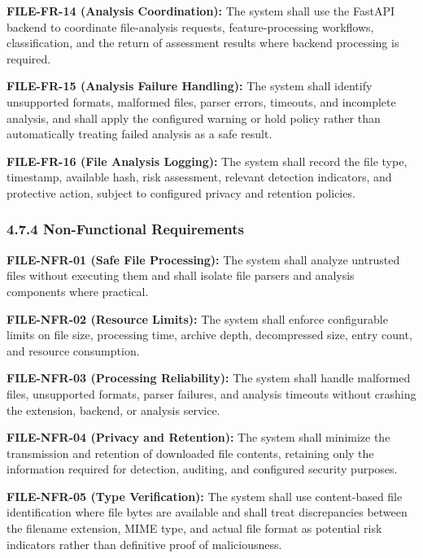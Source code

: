 \documentclass[12pt,a4paper]{report}
\begin{document}
\textbf{FILE-FR-14 (Analysis Coordination):} The system shall use the FastAPI backend to coordinate file-analysis requests, feature-processing workflows, classification, and the return of assessment results where backend processing is required.\par

\textbf{FILE-FR-15 (Analysis Failure Handling):} The system shall identify unsupported formats, malformed files, parser errors, timeouts, and incomplete analysis, and shall apply the configured warning or hold policy rather than automatically treating failed analysis as a safe result.\par

\textbf{FILE-FR-16 (File Analysis Logging):} The system shall record the file type, timestamp, available hash, risk assessment, relevant detection indicators, and protective action, subject to configured privacy and retention policies.\par

\subsubsection*{4.7.4 Non-Functional Requirements}

\textbf{FILE-NFR-01 (Safe File Processing):} The system shall analyze untrusted files without executing them and shall isolate file parsers and analysis components where practical.\par

\textbf{FILE-NFR-02 (Resource Limits):} The system shall enforce configurable limits on file size, processing time, archive depth, decompressed size, entry count, and resource consumption.\par

\textbf{FILE-NFR-03 (Processing Reliability):} The system shall handle malformed files, unsupported formats, parser failures, and analysis timeouts without crashing the extension, backend, or analysis service.\par

\textbf{FILE-NFR-04 (Privacy and Retention):} The system shall minimize the transmission and retention of downloaded file contents, retaining only the information required for detection, auditing, and configured security purposes.\par

\textbf{FILE-NFR-05 (Type Verification):} The system shall use content-based file identification where file bytes are available and shall treat discrepancies between the filename extension, MIME type, and actual file format as potential risk indicators rather than definitive proof of maliciousness.\par
\end{document}
